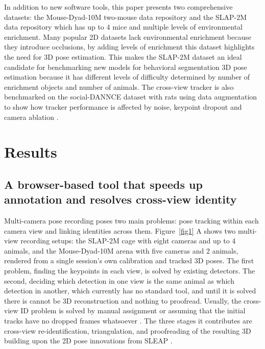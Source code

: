 \documentclass[pdflatex, sn-nature]{sn-jnl}
\theoremstyle{thmstyleone}%
\theoremstyle{thmstyletwo}%
\theoremstyle{thmstylethree}%
\begin{document}
In addition to new software tools, this paper presents two comprehensive datasets: the Mouse-Dyad-10M two-mouse data repository and the SLAP-2M data repository which has up to 4 mice and multiple levels of environmental enrichment. Many popular 2D datasets lack environmental enrichment because they introduce occlusions, by adding levels of enrichment this dataset highlights the need for 3D pose estimation. This makes the SLAP-2M dataset an ideal candidate for benchmarking new models for behavioral segmentation 3D pose estimation because it has different levels of difficulty determined by number of enrichment objects and number of animals. The cross-view tracker is also benchmarked on the social-DANNCE dataset with rats using data augmentation to show how tracker performance is affected by noise, keypoint dropout and camera ablation \citep{Klibaite2025}.

\section{Results}\label{sec2}

\subsection{A browser-based tool that speeds up annotation and resolves cross-view identity}\label{subsec2-1}

Multi-camera pose recording poses two main problems: pose tracking within each camera view and linking identities across them. Figure~\ref{fig1} A shows two multi-view recording setups: the SLAP-2M cage with eight cameras and up to 4 animals, and the Mouse-Dyad-10M arena with five cameras and 2 animals, rendered from a single session's own calibration and tracked 3D poses. The first problem, finding the keypoints in each view, is solved by existing detectors. The second, deciding which detection in one view is the same animal as which detection in another, which currently has no standard tool, and until it is solved there is cannot be 3D reconstruction and nothing to proofread. Usually, the cross-view ID problem is solved by manual assignment or assuming that the initial tracks have no dropped frames whatsoever \citep{Klibaite2025, Waldmann2024}. The three stages it contributes are cross-view re-identification, triangulation, and proofreading of the resulting 3D building upon the 2D pose innovations from SLEAP \citep{Pereira2022}.
\end{document}
